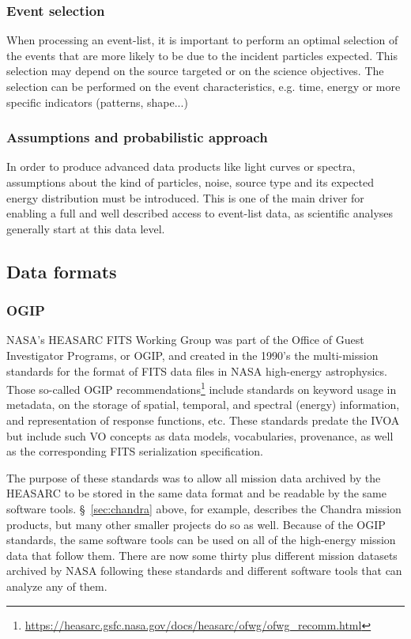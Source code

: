\documentclass[11pt,a4paper]{ivoa}
\begin{document}
\subsubsection{Event selection}

When processing an event-list, it is important to perform an optimal {selection of the events} that are more likely to be due to the incident particles expected. This selection may depend on the source targeted or on the science objectives. The selection can be performed on the event characteristics, e.g. time, energy or more specific indicators (patterns, shape...)


\subsubsection{Assumptions and probabilistic approach}

In order to produce advanced data products like light curves or spectra, {assumptions} about the kind of particles, noise, source type and its expected energy distribution must be introduced. This is one of the main driver for enabling a full and well described access to event-list data, as scientific analyses generally start at this data level.


\subsection{Data formats}
\label{sec:data_formats}

\subsubsection{{OGIP}}\label{sec:ogip}

NASA's HEASARC FITS Working Group was part of the Office of Guest Investigator Programs, or OGIP, and created in the 1990's the multi-mission standards for the format of FITS data files in NASA high-energy astrophysics. Those so-called OGIP  recommendations\footnote{\url{https://heasarc.gsfc.nasa.gov/docs/heasarc/ofwg/ofwg_recomm.html}} include standards on keyword usage in metadata, on the storage of spatial, temporal, and spectral (energy) information, and representation of response functions, etc.  These standards predate the IVOA but include such VO concepts as data models, vocabularies, provenance, as well as the corresponding FITS serialization specification.

The purpose of these standards was to allow all mission data archived by the HEASARC to be stored in the same data format and be readable by the same software tools. \S~\ref{sec:chandra} above, for example, describes the Chandra mission products, but many other smaller projects do so as well.  Because of the OGIP standards, the same software tools can be used on all of the high-energy mission data that follow them.  There are now some thirty plus different mission datasets archived by NASA following these standards and different software tools that can analyze any of them.
\end{document}
